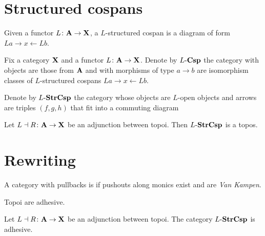\documentclass{amsart}
\begin{document}
\section{Structured cospans}
\label{sec_structured-cospans}
	
\begin{df} \label{df_structured-cospans}
	Given a functor $ L \colon \mathbf{A} \to \mathbf{X} $, a $ L $-structured cospan is a diagram of form $ L a \to x \gets L b $. 
\end{df}
	
\begin{df} \label{df_(-)Csp-category}
	Fix a category $ \mathbf{X} $ and a functor $ L \colon \mathbf{A} \to \mathbf{X} $. Denote by $  L  \text{-} \mathbf{Csp} $ the category with objects are those from $ \mathbf{A} $ and with morphisms of type $ a \to b $ are isomorphism classes of $ L $-structured cospans $ La \to x \gets Lb $.
\end{df}

\begin{df} \label{df_StrCsp-category}
	Denote by $ L \text{-} \mathbf{StrCsp} $ the category whose objects are $ L $-open objects and arrows are triples $ (f,g,h) $ that fit into a commuting diagram
\end{df}

\begin{thm} \label{thm_StrCsp-topos}
	Let $ L \dashv R \colon \mathbf{A} \to \mathbf{X} $ be an adjunction between topoi.  Then $ L \text{-} \mathbf{StrCsp} $ is a topos.  
\end{thm}

\section{Rewriting}

\begin{df} \label{df_adhesive-category}
	A category with pullbacks is  if pushouts along monics exist and are \emph{Van Kampen}.
\end{df} 

\begin{thm} \label{thm_topoi-adhesive}
	Topoi are adhesive.
\end{thm}

\begin{cor} \label{thm_category-StrCsp-adhsv}
	Let $ L \dashv R \colon \mathbf{A} \to \mathbf{X} $ be an adjunction between topoi.  The category $ L \text{-} \mathbf{StrCsp} $ is adhesive.
\end{cor}
\end{document}
